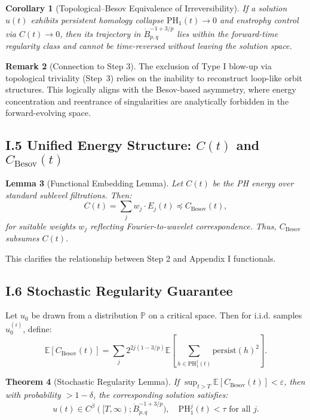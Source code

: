 \documentclass[11pt]{article}
\newtheorem{theorem}{Theorem}[section]
\newtheorem{lemma}[theorem]{Lemma}
\newtheorem{corollary}[theorem]{Corollary}
\theoremstyle{definition}
\newtheorem{remark}[theorem]{Remark}
\begin{document}
\begin{corollary}[Topological–Besov Equivalence of Irreversibility]
If a solution $u(t)$ exhibits persistent homology collapse $\mathrm{PH}_1(t) \to 0$ and enstrophy control via $C(t) \to 0$, then its trajectory in $\dot{B}^{-1+3/p}_{p,q}$ lies within the forward-time regularity class and cannot be time-reversed without leaving the solution space.
\end{corollary}

\begin{remark}[Connection to Step 3]
The exclusion of Type I blow-up via topological triviality (Step~3) relies on the inability to reconstruct loop-like orbit structures. This logically aligns with the Besov-based asymmetry, where energy concentration and reentrance of singularities are analytically forbidden in the forward-evolving space.
\end{remark}

\subsection*{I.5 Unified Energy Structure: $C(t)$ and $C_{\mathrm{Besov}}(t)$}
\begin{lemma}[Functional Embedding Lemma]
Let $C(t)$ be the PH energy over standard sublevel filtrations. Then:
\[
C(t) = \sum_j w_j \cdot E_j(t) \preceq C_{\mathrm{Besov}}(t),
\]
for suitable weights $w_j$ reflecting Fourier-to-wavelet correspondence. Thus, $C_{\mathrm{Besov}}$ subsumes $C(t)$.
\end{lemma}
This clarifies the relationship between Step 2 and Appendix I functionals.

\subsection*{I.6 Stochastic Regularity Guarantee}
Let $u_0$ be drawn from a distribution $\mathbb{P}$ on a critical space. Then for i.i.d. samples $u_0^{(i)}$, define:
\[
\mathbb{E}[C_{\mathrm{Besov}}(t)] = \sum_j 2^{2j(1-3/p)} \mathbb{E}\left[ \sum_{h \in \mathrm{PH}^j_1(t)} \mathrm{persist}(h)^2 \right].
\]
\begin{theorem}[Stochastic Regularity Lemma]
If $\sup_{t > T} \mathbb{E}[C_{\mathrm{Besov}}(t)] < \varepsilon$, then with probability $> 1 - \delta$, the corresponding solution satisfies:
\[
u(t) \in C^\beta([T,\infty); \dot{B}^{-1+3/p}_{p,q}), \quad \mathrm{PH}^j_1(t) < \tau \text{ for all } j.\]
\end{theorem}
\end{document}
